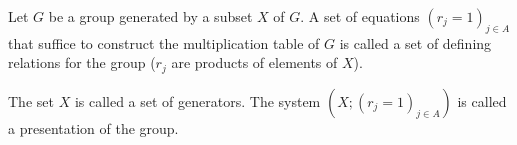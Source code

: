 \begin{defi}
    Let $G$ be a group generated by a subset $X$ of $G$. A set of equations $(r_j=1)_{j\in A}$ that suffice to construct the multiplication table of $G$ is called a set of defining relations for the group ($r_j$ are products of elements of $X$).

    The set $X$ is called a set of generators. The system $(X;(r_j=1)_{j\in A})$ is called a presentation of the group.
\end{defi}